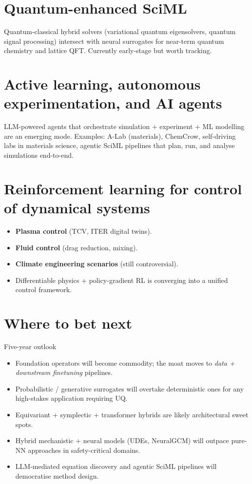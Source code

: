 \section{Quantum-enhanced SciML}
Quantum-classical hybrid solvers (variational quantum eigensolvers,
quantum signal processing) intersect with neural surrogates for
near-term quantum chemistry and lattice QFT. Currently early-stage but
worth tracking.

\section{Active learning, autonomous experimentation, and AI agents}
LLM-powered agents that orchestrate simulation $+$ experiment $+$ ML
modelling are an emerging mode. Examples: A-Lab (materials), ChemCrow,
self-driving labs in materials science, agentic SciML pipelines that
plan, run, and analyse simulations end-to-end.

\section{Reinforcement learning for control of dynamical systems}
\begin{itemize}
\item \textbf{Plasma control} (TCV, ITER digital twins).
\item \textbf{Fluid control} (drag reduction, mixing).
\item \textbf{Climate engineering scenarios} (still controversial).
\item Differentiable physics + policy-gradient RL is converging into a
unified control framework.
\end{itemize}

\section{Where to bet next}
\begin{insight}{Five-year outlook}
\begin{itemize}
\item Foundation operators will become commodity; the moat moves to
\emph{data + downstream finetuning} pipelines.
\item Probabilistic / generative surrogates will overtake deterministic
ones for any high-stakes application requiring UQ.
\item Equivariant + symplectic + transformer hybrids are likely
architectural sweet spots.
\item Hybrid mechanistic + neural models (UDEs, NeuralGCM) will outpace
pure-NN approaches in safety-critical domains.
\item LLM-mediated equation discovery and agentic SciML pipelines will
democratise method design.
\end{itemize}
\end{insight}
